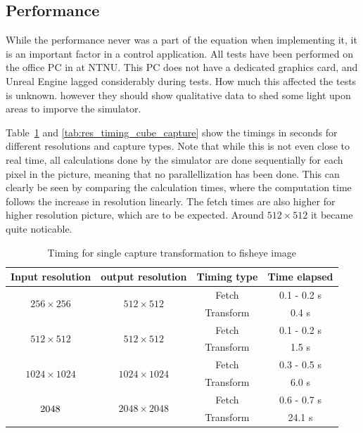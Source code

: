 \subsection{Performance}

While the performance never was a part of the equation when implementing it, it is an important factor in a control application. All tests have been performed on the office PC in at NTNU. This PC does not have a dedicated graphics card, and Unreal Engine lagged considerably during tests. How much this affected the tests is unknown. however they should show qualitative data to shed some light upon areas to imporve the simulator.

Table~\ref{tab:res_timing_single} and \ref{tab:res_timing_cube_capture} show the timings in seconds for different resolutions and capture types. Note that while this is not even close to real time, all calculations done by the simulator are done sequentially for each pixel in the picture, meaning that no parallellization has been done. This can clearly be seen by comparing the calculation times, where the computation time follows the increase in resolution linearly. The fetch times are also higher for higher resolution picture, which are to be expected. Around $512\times 512$ it became quite noticable. 

\begin{table}[!htb]
    \centering
    \begin{tabular}{|c|c|c|c|} \hline
        \textbf{Input resolution} & \textbf{output resolution} & \textbf{Timing type} & \textbf{Time elapsed} \\ \hline \hline
        \multirow{2}{*}{$256 \times 256$} & \multirow{2}{*}{$512 \times 512$} & Fetch & 0.1 - 0.2 s \\ \cline{3-4}
         & & Transform & 0.4 s \\ \hline
        \multirow{2}{*}{$512 \times 512$} & \multirow{2}{*}{$512 \times 512$} & Fetch & 0.1 - 0.2 s\\ \cline{3-4}
         & & Transform & 1.5 s \\ \cline{2-4}
        \multirow{2}{*}{$1024 \times 1024$} & \multirow{2}{*}{$1024 \times 1024$} & Fetch &  0.3 - 0.5 s \\ \cline{3-4}
         & & Transform & 6.0 s \\ \hline
        \multirow{2}{*}{$2048 \time 2048$} & \multirow{2}{*}{$2048 \times 2048$} & Fetch & 0.6 - 0.7 s\\ \cline{3-4}
         & & Transform & 24.1 s\\ \hline
    \end{tabular}
    \caption{Timing for single capture transformation to fisheye image}
    \label{tab:res_timing_single}
\end{table}

